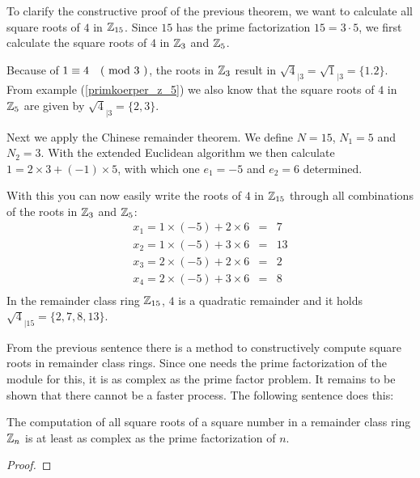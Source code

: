\begin{example} To clarify the constructive proof of the previous theorem, we want to calculate all square roots of $ 4 $ in $ \mathbb{Z}_{15} $. Since $ 15 $ has the prime factorization $ 15 = 3 \cdot 5 $, we first calculate the square roots of $ 4 $ in $ \mathbb{Z}_3 $ and $ \mathbb{Z}_5 $.

Because of $ 1 \equiv 4 \quad \text{( mod } 3 \text{ )} $, the roots in $ \mathbb{Z}_3 $ result in $ \sqrt{4} _{| 3} = \sqrt{1} _{| 3} = \{ 1.2 \} $. From example (\ref{primkoerper_z_5}) we also know that the square roots of $ 4 $ in $ \mathbb{Z}_5 $ are given by $ \sqrt{4} _{| 3} = \{2,3 \} $.

Next we apply the Chinese remainder theorem. We define
$ N = 15 $, $ N_1 = 5 $ and $ N_2 = 3 $. With the extended Euclidean algorithm
we then calculate $ 1 = 2 \times 3 + (-1) \times 5 $, with which one
$ e_1 = -5 $ and $ e_2 = 6 $ determined.

With this you can now easily write the roots of $ 4 $ in $ \mathbb{Z}_{15} $ through all combinations of the roots in $ \mathbb{Z}_3 $ and $ \mathbb{Z}_5 $:
\begin{equation}
\begin{array}{rcl}
x_1 = 1 \times (-5) + 2 \times 6 & = & 7 \\
x_2 = 1 \times (-5) + 3 \times 6 & = & 13 \\
x_3 = 2 \times (-5) + 2 \times 6 & = & 2 \\
x_4 = 2 \times (-5) + 3 \times 6 & = & 8 \\
\end{array}
\end{equation}
In the remainder class ring $ \mathbb{Z}_{15} $, $ 4 $ is a quadratic remainder and it holds
$ \sqrt{4} _{| 15} = \{2,7,8,13 \} $.
\end{example}
From the previous sentence there is a method to constructively compute square roots in remainder class rings. Since one needs the prime factorization of the module for this, it is as complex as the prime factor problem. It remains to be shown that there cannot be a faster process. The following sentence does this:
\begin{theorem}
\label{theorem: square_roots_as_compl_as_factor}
The computation of all square roots of a square number in a remainder class ring $ \mathbb{Z}_n $ is at least as complex as the prime factorization of $ n $.
\end{theorem}
\begin{proof}
\end{proof}

